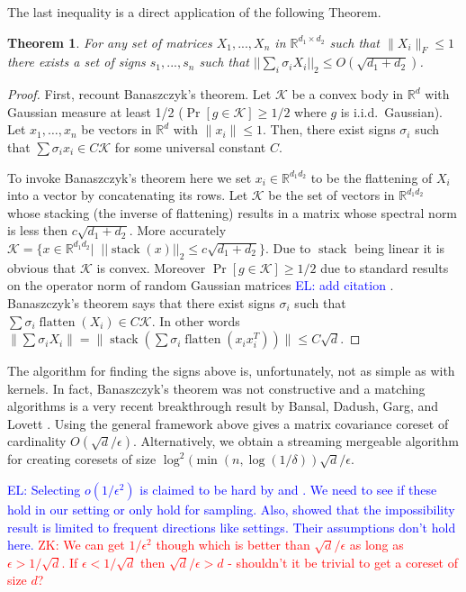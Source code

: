 \documentclass{article} %
\newtheorem{theorem}{Theorem}[section]
\newcommand{\zk}[1]{\textcolor{red}{ZK: #1}}
\newcommand{\el}[1]{\textcolor{blue}{EL: #1}}
\newcommand{\R}{\mathbb{R}}
\newcommand{\eps}{\epsilon}
\begin{document}
\noindent The last inequality is a direct application of the following Theorem.
\begin{theorem}\label{BansalInDaHouz}
For any set of matrices $X_1,...,X_n$ in $\R^{d_1 \times d_2}$ such that $\|X_i\|_{F} \le 1$ there exists a set of signs $s_1,...,s_n$ such that $||\sum_i \sigma_i X_i||_{2} \le O(\sqrt{d_1 + d_2})$.
\end{theorem}
\begin{proof}
First, recount Banaszczyk's theorem. 
Let $\mathcal K$ be a convex body in $\R^d$ with Gaussian measure at least 1/2 ($\Pr[g \in \mathcal K] \ge 1/2$ where $g$ is i.i.d.\ Gaussian).
Let $x_1,\ldots,x_n$ be vectors in $\R^d$ with $\|x_i\| \le 1$. 
Then, there exist signs $\sigma_i$ such that $\sum \sigma_i x_i \in C \mathcal K$ for some universal constant $C$.

To invoke Banaszczyk's theorem here we set $x_i \in \R^{d_1d_2}$ to be the flattening of $X_i$ into a vector by concatenating its rows. 
Let $\mathcal K$ be the set of vectors in $\R^{d_1d_2}$ whose stacking (the inverse of flattening) results in a matrix whose spectral norm is less then $c\sqrt{d_1 + d_2}$.
More accurately $\mathcal K = \{x  \in \R^{d_1d_2} |\;\; ||\operatorname{stack}(x)||_2 \le c\sqrt{d_1+d_2}\}$. 
Due to $\operatorname{stack}$ being linear it is obvious that $\mathcal K$ is convex. 
Moreover $\Pr[g \in \mathcal K] \ge 1/2$ due to standard results on the operator norm of random Gaussian matrices \el{add citation \cite{}}.
Banaszczyk's theorem says that there exist signs $\sigma_i$ such that $\sum \sigma_i \operatorname{flatten}(X_i) \in C \mathcal K$.
In other words $\| \sum \sigma_i X_i\| = \| \operatorname{stack}( \sum \sigma_i \operatorname{flatten}(x_i x_i^T)) \| \le C \sqrt{d}$. 
\end{proof}
The algorithm for finding the signs above is, unfortunately, not as simple as with kernels. 
In fact, Banaszczyk's theorem was not constructive and a matching algorithms is a very recent breakthrough result by Bansal, Dadush, Garg, and Lovett \cite{DBLP:conf/stoc/BansalDGL18}.
Using the general framework above gives a matrix covariance coreset of cardinality $O(\sqrt{d}/\eps)$.
Alternatively, we obtain a streaming mergeable algorithm for creating coresets of size $\log^{2}(\min(n, \log(1/\delta)) \sqrt{d}/\eps$.



\el{Selecting $o(1/\eps^2)$ is claimed to be hard by \cite{DBLP:conf/focs/DeshpandeR10} and \cite{DBLP:conf/soda/DeshpandeRVW06}. We need to see if these hold in our setting or only hold for sampling.  Also, \cite{DBLP:conf/soda/GhashamiP14} showed that the impossibility result is limited to frequent directions like settings. Their assumptions don't hold here.} \zk{We can get $1/\eps^2$ though which is better than $\sqrt{d}/\eps$ as long as $\eps > 1/\sqrt{d}$. If $\eps < 1/\sqrt{d}$ then $\sqrt{d}/\eps > d$ - shouldn't it be trivial to get a coreset of size $d$?}
\end{document}
